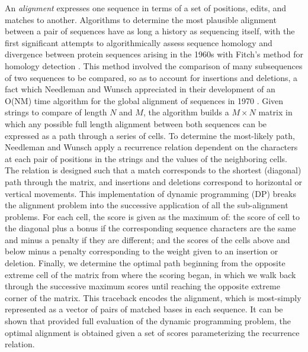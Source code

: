 An \emph{alignment} expresses one sequence in terms of a set of positions, edits, and matches to another.
Algorithms to determine the most plausible alignment between a pair of sequences have as long a history as sequencing itself, with the first significant attempts to algorithmically assess sequence homology and divergence between protein sequences arising in the 1960s with Fitch's method for homology detection \cite{fitch1966improved}.
This method involved the comparison of many subsequences of two sequences to be compared, so as to account for insertions and deletions, a fact which Needleman and Wunsch appreciated in their development of an O(NM) time algorithm for the global alignment of sequences in 1970 \cite{needleman1970general}.
Given strings to compare of length $N$ and $M$, the algorithm builds a $M \times N$ matrix in which any possible full length alignment between both sequences can be expressed as a path through a series of cells.
To determine the most-likely path, Needleman and Wunsch apply a recurrence relation dependent on the characters at each pair of positions in the strings and the values of the neighboring cells.
The relation is designed such that a match corresponds to the shortest (diagonal) path through the matrix, and insertions and deletions correspond to horizontal or vertical movements.
This implementation of dynamic programming (DP) \cite{bellman1952theory} breaks the alignment problem into the successive application of all the sub-alignment problems.
For each cell, the score is given as the maximum of: the score of cell to the diagonal plus a bonus if the corresponding sequence characters are the same and minus a penalty if they are different; and the scores of the cells above and below minus a penalty corresponding to the weight given to an insertion or deletion.
Finally, we determine the optimal path beginning from the opposite extreme cell of the matrix from where the scoring began, in which we walk back through the successive maximum scores until reaching the opposite extreme corner of the matrix.
This traceback encodes the alignment, which is most-simply represented as a vector of pairs of matched bases in each sequence.
It can be shown that provided full evaluation of the dynamic programming problem, the optimal alignment is obtained given a set of scores parameterizing the recurrence relation.

